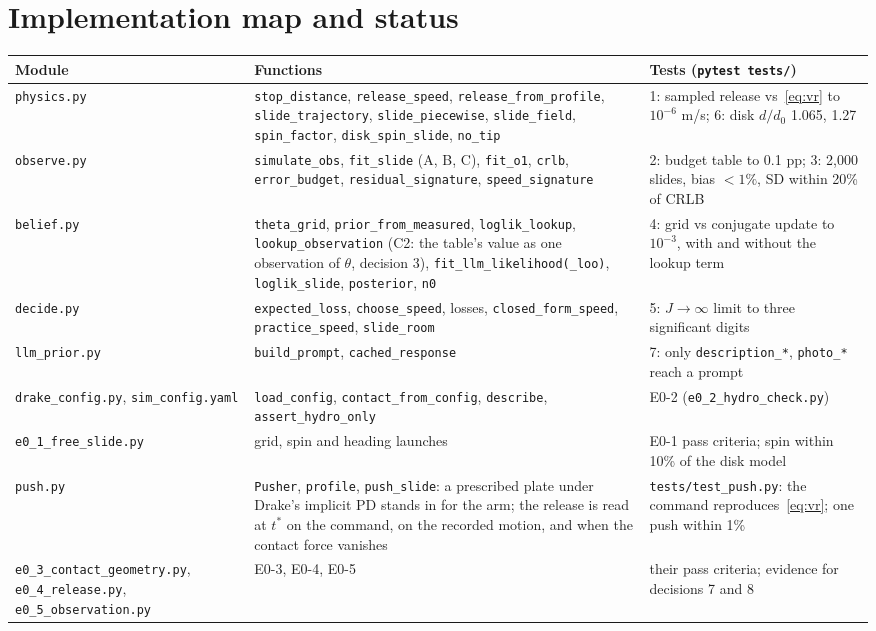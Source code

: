 \documentclass[10pt]{article}
\newcommand{\code}[1]{\texttt{#1}}
\begin{document}
\section{Implementation map and status}
\label{sec:impl}
\begin{center}\small
\begin{tabular}{@{}lp{7.6cm}p{5.2cm}@{}}
\toprule
Module & Functions & Tests (\code{pytest tests/})\\
\midrule
\code{physics.py} & \code{stop\_distance}, \code{release\_speed}, \code{release\_from\_profile}, \code{slide\_trajectory}, \code{slide\_piecewise}, \code{slide\_field}, \code{spin\_factor}, \code{disk\_spin\_slide}, \code{no\_tip} & 1: sampled release vs~\eqref{eq:vr} to $10^{-6}$ m/s; 6: disk $d/d_0$ 1.065, 1.27\\
\code{observe.py} & \code{simulate\_obs}, \code{fit\_slide} (A, B, C), \code{fit\_o1}, \code{crlb}, \code{error\_budget}, \code{residual\_signature}, \code{speed\_signature} & 2: budget table to 0.1 pp; 3: 2,000 slides, bias $<1\%$, SD within 20\% of CRLB\\
\code{belief.py} & \code{theta\_grid}, \code{prior\_from\_measured}, \code{loglik\_lookup}, \code{lookup\_observation} (C2: the table's value as one observation of $\theta$, decision 3), \code{fit\_llm\_likelihood(\_loo)}, \code{loglik\_slide}, \code{posterior}, \code{n0} & 4: grid vs conjugate update to $10^{-3}$, with and without the lookup term\\
\code{decide.py} & \code{expected\_loss}, \code{choose\_speed}, losses, \code{closed\_form\_speed}, \code{practice\_speed}, \code{slide\_room} & 5: $J\to\infty$ limit to three significant digits\\
\code{llm\_prior.py} & \code{build\_prompt}, \code{cached\_response} & 7: only \code{description\_*}, \code{photo\_*} reach a prompt\\
\code{drake\_config.py}, \code{sim\_config.yaml} & \code{load\_config}, \code{contact\_from\_config}, \code{describe}, \code{assert\_hydro\_only} & E0-2 (\code{e0\_2\_hydro\_check.py})\\
\code{e0\_1\_free\_slide.py} & grid, spin and heading launches & E0-1 pass criteria; spin within 10\% of the disk model\\
\code{push.py} & \code{Pusher}, \code{profile}, \code{push\_slide}: a prescribed plate under Drake's implicit PD stands in for the arm; the release is read at $t^*$ on the command, on the recorded motion, and when the contact force vanishes & \code{tests/test\_push.py}: the command reproduces~\eqref{eq:vr}; one push within 1\%\\
\code{e0\_3\_contact\_geometry.py}, \code{e0\_4\_release.py}, \code{e0\_5\_observation.py} & E0-3, E0-4, E0-5 & their pass criteria; evidence for decisions 7 and 8\\
\bottomrule
\end{tabular}
\end{center}
\end{document}

